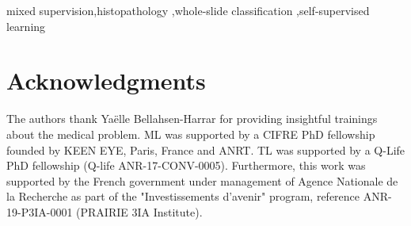\documentclass[times,twocolumn,final]{elsarticle}
\begin{document}
\begin{frontmatter}
\begin{keyword}
\KWD mixed supervision\sep histopathology \sep whole-slide classification \sep self-supervised learning
\end{keyword}

\end{frontmatter}














\section*{Acknowledgments}
The authors thank Ya\"elle Bellahsen-Harrar for providing insightful trainings about the medical problem. ML was supported by a CIFRE PhD fellowship founded by KEEN EYE, Paris, France and ANRT. TL was supported by a Q-Life PhD fellowship (Q-life ANR-17-CONV-0005). Furthermore, this work was supported by the French government under management of Agence Nationale de la Recherche as part of the "Investissements d'avenir" program, reference ANR-19-P3IA-0001 (PRAIRIE 3IA Institute).



\end{document}
